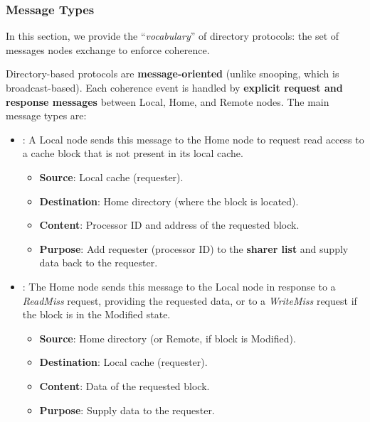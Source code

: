 \subsubsection{Message Types}

In this section, we provide the ``\emph{vocabulary}'' of directory protocols: the set of messages nodes exchange to enforce coherence.

\highspace
Directory-based protocols are \textbf{message-oriented} (unlike snooping, which is broadcast-based). Each coherence event is handled by \textbf{explicit request and response messages} between Local, Home, and Remote nodes. The main message types are:
\begin{itemize}
    \item {}: A Local node sends this message to the Home node to request read access to a cache block that is not present in its local cache.
    \begin{itemize}
        \item[\textcolor{Green3}{\faIcon{arrow-right}}] \textcolor{Green3}{\textbf{Source}}: Local cache (requester).
        \item[\textcolor{Green3}{\faIcon{arrow-left}}] \textcolor{Green3}{\textbf{Destination}}: Home directory (where the block is located).
        \item[\textcolor{Green3}{\faIcon{file-alt}}] \textcolor{Green3}{\textbf{Content}}: Processor ID and address of the requested block.
        \item[\textcolor{Green3}{\faIcon{question-circle}}] \textcolor{Green3}{\textbf{Purpose}}: Add requester (processor ID) to the \textbf{sharer list} and supply data back to the requester.
    \end{itemize}


    \item {}: The Home node sends this message to the Local node in response to a \emph{ReadMiss} request, providing the requested data, or to a \emph{WriteMiss} request if the block is in the Modified state.
    \begin{itemize}
        \item[\textcolor{Green3}{\faIcon{arrow-right}}] \textcolor{Green3}{\textbf{Source}}: Home directory (or Remote, if block is Modified).
        \item[\textcolor{Green3}{\faIcon{arrow-left}}] \textcolor{Green3}{\textbf{Destination}}: Local cache (requester).
        \item[\textcolor{Green3}{\faIcon{file-alt}}] \textcolor{Green3}{\textbf{Content}}: Data of the requested block.
        \item[\textcolor{Green3}{\faIcon{question-circle}}] \textcolor{Green3}{\textbf{Purpose}}: Supply data to the requester.
    \end{itemize}



\end{itemize}
